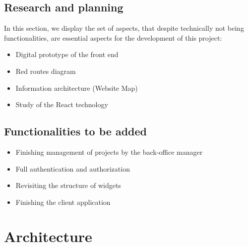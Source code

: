 \documentclass[a4paper,twoside,10pt]{report}
\begin{document}
\newpage
\section{Research and planning}
In this section, we display the set of aspects, that despite technically not being functionalities, are essential aspects for the development of this project:
\\ \newline
\begin{itemize}
    \item Digital prototype of the front end
    \item Red routes diagram
    \item Information architecture (Website Map)
    \item Study of the React technology
\end{itemize}

\section{Functionalities to be added}
\begin{itemize}
    \item Finishing management of projects by the back-office manager
    \item Full authentication and authorization
    \item Revisiting the structure of widgets
    \item Finishing the client application
\end{itemize}

\chapter{Architecture}
\end{document}
